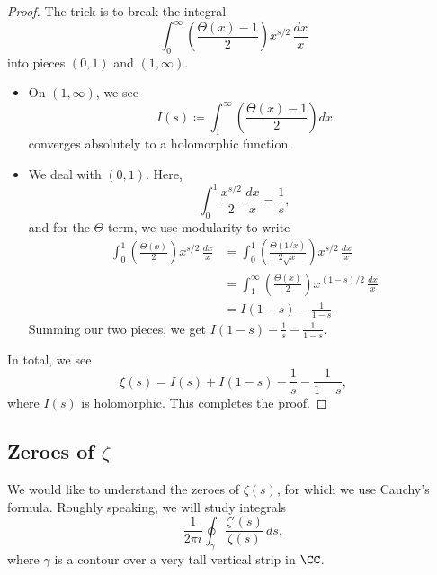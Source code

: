 \documentclass[../notes.tex]{subfiles}
\begin{document}
\begin{proof}
	The trick is to break the integral
	\[\int_0^\infty\left(\frac{\Theta(x)-1}2\right)x^{s/2}\,\frac{dx}x\]
	into pieces $(0,1)$ and $(1,\infty)$.
	\begin{itemize}
		\item On $(1,\infty)$, we see
		\[I(s)\coloneqq\int_1^\infty\left(\frac{\Theta(x)-1}2\right)dx\]
		converges absolutely to a holomorphic function.
		\item We deal with $(0,1)$. Here,
		\[\int_0^1\frac{x^{s/2}}2\,\frac{dx}x=\frac1s,\]
		and for the $\Theta$ term, we use modularity to write
		\begin{align*}
			\int_0^1\left(\frac{\Theta(x)}2\right)x^{s/2}\,\frac{dx}x &= \int_0^1\left(\frac{\Theta(1/x)}{2\sqrt x}\right)x^{s/2}\,\frac{dx}x \\
			&= \int_1^\infty\left(\frac{\Theta(x)}2\right)x^{(1-s)/2}\,\frac{dx}x \\
			&= I(1-s)-\frac1{1-s}.
		\end{align*}
		Summing our two pieces, we get $I(1-s)-\frac1s-\frac1{1-s}$.
	\end{itemize}
	In total, we see
	\[\xi(s)=I(s)+I(1-s)-\frac1s-\frac1{1-s},\]
	where $I(s)$ is holomorphic. This completes the proof.
\end{proof}

\subsection{Zeroes of \texorpdfstring{$\zeta$}{ Zeta}}
We would like to understand the zeroes of $\zeta(s)$, for which we use Cauchy's formula. Roughly speaking, we will study integrals
\[\frac1{2\pi i}\oint_\gamma\frac{\zeta'(s)}{\zeta(s)}\,ds,\]
where $\gamma$ is a contour over a very tall vertical strip in $\CC$.
\end{document}
